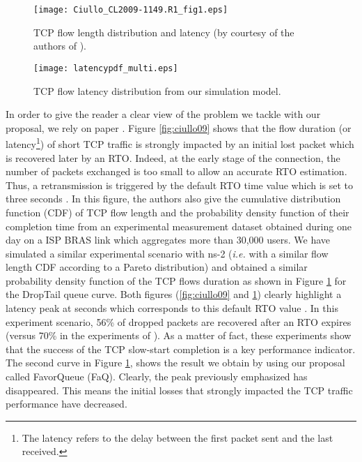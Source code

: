 \documentclass{elsart}
\begin{document}
\begin{figure}[htb!]
   \begin{minipage}[b]{1.0\columnwidth}
	\centering
	\texttt{[image: Ciullo\_CL2009-1149.R1\_fig1.eps]}
	\caption{TCP flow length distribution and latency (by courtesy of the authors of \cite{ciullo09}).}
	\label{fig:ciullo09}
   \end{minipage}
   
   \begin{minipage}[b]{1.0\columnwidth}   
	\centering
  	\texttt{[image: latencypdf\_multi.eps]}
  	\caption{TCP flow latency distribution from our simulation model.}
  	\label{fig:delaypdf}
   \end{minipage}
\end{figure}


In order to give the reader a clear view of the problem we tackle with our proposal, we rely on paper \cite{ciullo09}. 
Figure \ref{fig:ciullo09} shows that the flow duration (or latency\footnote{The latency refers to the delay between the first packet sent and the last received.}) 
of short TCP traffic is strongly impacted by an initial lost packet which is recovered later by an RTO. 
Indeed, at the early stage of the connection, the number of packets exchanged is too small to allow an accurate RTO estimation. Thus, a retransmission is triggered by the default RTO time value which is set to three seconds \cite{rfc1122}. In this figure, the authors also give the cumulative distribution function (CDF) of TCP flow length and the probability density function of their completion time from an experimental measurement dataset obtained during one day on a ISP BRAS link which aggregates more than 30,000 users. We have simulated a similar experimental scenario with ns-2 (\textit{i.e.} with a similar flow length CDF according to a Pareto distribution) and obtained a similar probability density function of the TCP flows duration as shown in Figure \ref{fig:delaypdf} for the DropTail queue curve. Both figures (\ref{fig:ciullo09} and \ref{fig:delaypdf}) clearly highlight a latency peak at  seconds which corresponds to this default RTO value \cite{rfc1122}. In this experiment scenario, 56\% of dropped packets are recovered after an RTO expires (versus 70\% in the experiments of \cite{ciullo09}). As a matter of fact, these experiments show that the success of the TCP slow-start completion is a key performance indicator.
The second curve in Figure \ref{fig:delaypdf}, shows the result we obtain by using our proposal called FavorQueue (FaQ). Clearly, the peak previously emphasized has disappeared. This means the initial losses that strongly impacted the TCP traffic performance have decreased.
\end{document}
